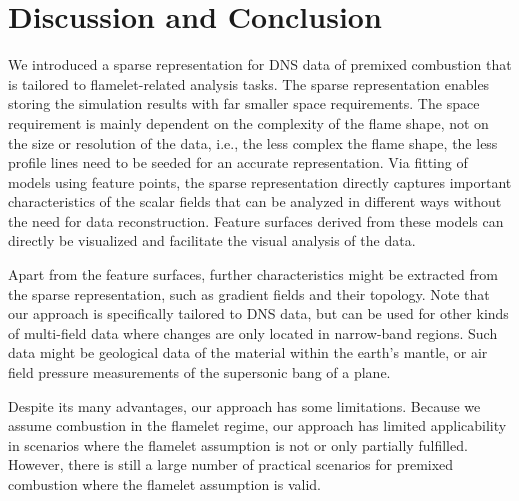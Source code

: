 \section{Discussion and Conclusion}
\label{sec:conclusion}
%
We introduced a sparse representation for \ac{DNS} data of premixed combustion
that is tailored to flamelet-related analysis tasks.
%
The sparse representation enables storing the simulation results with far
smaller space requirements.
%
The space requirement is mainly dependent on the complexity of the flame shape,
not on the size or resolution of the data, i.e., the less complex the flame
shape, the less profile lines need to be seeded for an accurate representation.
%
Via fitting of models using feature points, the sparse representation directly
captures important characteristics of the scalar fields that can be analyzed in
different ways without the need for data reconstruction.
%
Feature surfaces derived from these models can directly be visualized and
facilitate the visual analysis of the data.
%


Apart from the feature surfaces, further characteristics might be extracted from
the sparse representation, such as gradient fields and their topology.
%
Note that our approach is specifically tailored to \ac{DNS} data, but can be
used for other kinds of multi-field data where changes are only located in
narrow-band regions.
%
Such data might be geological data of the material within the earth's mantle, or
air field pressure measurements of the supersonic bang of a plane.

%
Despite its many advantages, our approach has some limitations.
%
Because we assume combustion in the flamelet regime, our approach has limited
applicability in scenarios where the flamelet assumption is not or only
partially fulfilled.
%
However, there is still a large number of practical scenarios for premixed
combustion where the flamelet assumption is valid.
%

